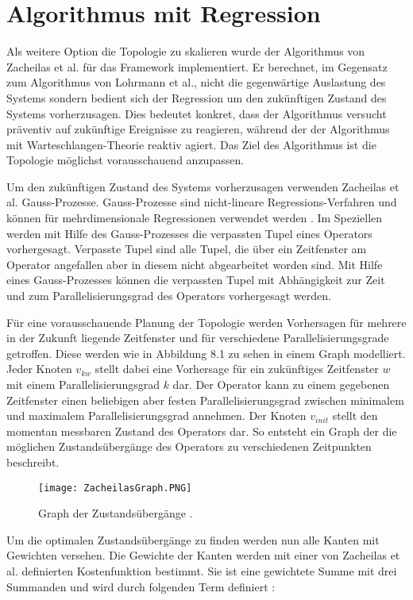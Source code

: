 \chapter{Algorithmus mit Regression}

Als weitere Option die Topologie zu skalieren wurde der Algorithmus von Zacheilas et al. \cite{zacheilas_elastic_2015} für das Framework implementiert.
Er berechnet, im Gegensatz zum Algorithmus von Lohrmann et al., nicht die gegenwärtige Auslastung des Systems sondern bedient sich der Regression um den zukünftigen Zustand des Systems vorherzusagen.
Dies bedeutet konkret, dass der Algorithmus versucht präventiv auf zukünftige Ereignisse zu reagieren, während der der Algorithmus mit Warteschlangen-Theorie reaktiv agiert.
Das Ziel des Algorithmus ist die Topologie möglichst vorausschauend anzupassen.

Um den zukünftigen Zustand des Systems vorherzusagen verwenden Zacheilas et al. Gauss-Prozesse.
Gauss-Prozesse sind nicht-lineare Regressions-Verfahren und können für mehrdimensionale Regressionen verwendet werden \cite{rasmussen2004gaussian}.
Im Speziellen werden mit Hilfe des Gauss-Prozesses die verpassten Tupel eines Operators vorhergesagt.
Verpasste Tupel sind alle Tupel, die über ein Zeitfenster am Operator angefallen aber in diesem nicht abgearbeitet worden sind.
Mit Hilfe eines Gauss-Prozesses können die verpassten Tupel mit Abhängigkeit zur Zeit und zum Parallelisierungsgrad des Operators vorhergesagt werden.

Für eine vorausschauende Planung der Topologie werden Vorhersagen für mehrere in der Zukunft liegende Zeitfenster und für verschiedene Parallelisierungsgrade getroffen.
Diese werden wie in Abbildung 8.1 zu sehen in einem Graph modelliert.
Jeder Knoten \(v_{kw}\) stellt dabei eine Vorhersage für ein zukünftiges Zeitfenster \(w\) mit einem Parallelisierungsgrad \(k\) dar.
Der Operator kann zu einem gegebenen Zeitfenster einen beliebigen aber festen Parallelisierungsgrad zwischen minimalem und maximalem Parallelisierungsgrad annehmen.
Der Knoten \(v_{init}\) stellt den momentan messbaren Zustand des Operators dar.
So entsteht ein Graph der die möglichen Zustandsübergänge des Operators zu verschiedenen Zeitpunkten beschreibt.

\begin{figure}
\texttt{[image: ZacheilasGraph.PNG]}
\caption{Graph der Zustandsübergänge \cite{zacheilas_elastic_2015}.}
\end{figure}

Um die optimalen Zustandsübergänge zu finden werden nun alle Kanten mit Gewichten versehen.
Die Gewichte der Kanten werden mit einer von Zacheilas et al. definierten Kostenfunktion bestimmt. Sie ist eine gewichtete Summe mit drei Summanden und wird durch folgenden Term definiert \cite{zacheilas_elastic_2015}:

